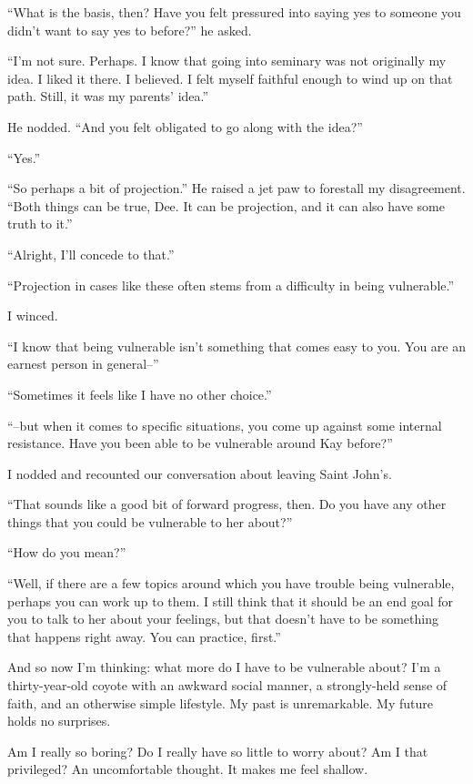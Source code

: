 ``What is the basis, then? Have you felt pressured into saying yes to someone you didn't want to say yes to before?'' he asked.

``I'm not sure. Perhaps. I know that going into seminary was not originally my idea. I liked it there. I believed. I felt myself faithful enough to wind up on that path. Still, it was my parents' idea.''

He nodded. ``And you felt obligated to go along with the idea?''

``Yes.''

``So perhaps a bit of projection.'' He raised a jet paw to forestall my disagreement. ``Both things can be true, Dee. It can be projection, and it can also have some truth to it.''

``Alright, I'll concede to that.''

``Projection in cases like these often stems from a difficulty in being vulnerable.''

I winced.

``I know that being vulnerable isn't something that comes easy to you. You are an earnest person in general--''

``Sometimes it feels like I have no other choice.''

``--but when it comes to specific situations, you come up against some internal resistance. Have you been able to be vulnerable around Kay before?''

I nodded and recounted our conversation about leaving Saint John's.

``That sounds like a good bit of forward progress, then. Do you have any other things that you could be vulnerable to her about?''

``How do you mean?''

``Well, if there are a few topics around which you have trouble being vulnerable, perhaps you can work up to them. I still think that it should be an end goal for you to talk to her about your feelings, but that doesn't have to be something that happens right away. You can practice, first.''

And so now I'm thinking: what more do I have to be vulnerable about? I'm a thirty-year-old coyote with an awkward social manner, a strongly-held sense of faith, and an otherwise simple lifestyle. My past is unremarkable. My future holds no surprises.

Am I really so boring? Do I really have so little to worry about? Am I that privileged? An uncomfortable thought. It makes me feel shallow.

